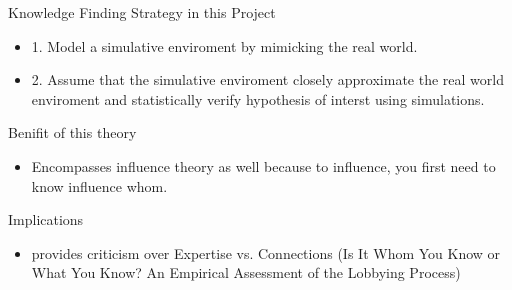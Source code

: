 \documentclass{beamer}
\begin{document}
	\begin{frame}{Knowledge Finding Strategy in this Project}
		\begin{itemize}
			\item 1. Model a simulative enviroment by mimicking the real world.
			\item 2. Assume that the simulative enviroment closely approximate the real world enviroment and statistically verify hypothesis of interst using simulations.
		\end{itemize}
	\end{frame}

	\begin{frame}{Benifit of this theory}
		\begin{itemize}
			\item Encompasses influence theory as well because to influence, you first need to know influence whom.
		\end{itemize}
	\end{frame}


	\begin{frame}{Implications}
		\begin{itemize}
			\item provides criticism over Expertise vs. Connections (Is It Whom You Know or What You Know?
			An Empirical Assessment of the Lobbying Process)
		\end{itemize}
	\end{frame}
\end{document}
